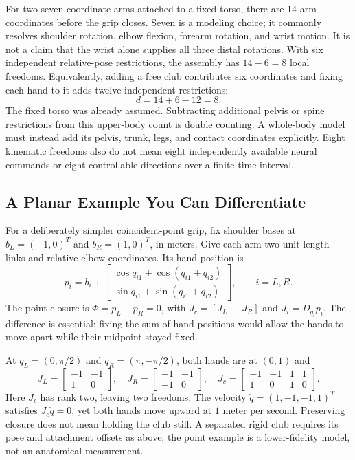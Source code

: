 For two seven-coordinate arms attached to a fixed torso, there are 14 arm
coordinates before the grip closes. Seven is a modeling choice; it commonly
resolves shoulder rotation, elbow flexion, forearm rotation, and wrist motion.
It is not a claim that the wrist alone supplies all three distal rotations.
With six independent relative-pose restrictions, the assembly has $14-6=8$
local freedoms. Equivalently, adding a free club contributes six coordinates
and fixing each hand to it adds twelve independent restrictions:
\begin{equation}
 d=14+6-12=8.
 \label{eq:two_arm_dof_with_grip}
\end{equation}
The fixed torso was already assumed. Subtracting additional pelvis or spine
restrictions from this upper-body count is double counting. A whole-body model
must instead add its pelvis, trunk, legs, and contact coordinates explicitly.
Eight kinematic freedoms also do not mean eight independently available neural
commands or eight controllable directions over a finite time interval.

\subsection{A Planar Example You Can Differentiate}

For a deliberately simpler coincident-point grip, fix shoulder bases at
$b_L=(-1,0)^T$ and $b_R=(1,0)^T$, in meters. Give each arm two unit-length links
and relative elbow coordinates. Its hand position is
\begin{equation}
 p_i=b_i+
 \begin{bmatrix}\cos q_{i1}+\cos(q_{i1}+q_{i2})\\
 \sin q_{i1}+\sin(q_{i1}+q_{i2})\end{bmatrix},\qquad i=L,R.
 \label{eq:two_arm_positions}
\end{equation}
The point closure is $\Phi=p_L-p_R=0$, with $J_c=[J_L\;-J_R]$ and
$J_i=D_{q_i}p_i$. The difference is essential: fixing the sum of hand positions
would allow the hands to move apart while their midpoint stayed fixed.

At $q_L=(0,\pi/2)$ and $q_R=(\pi,-\pi/2)$, both hands are at $(0,1)$ and
\begin{equation}
 J_L=\begin{bmatrix}-1&-1\\1&0\end{bmatrix},\quad
 J_R=\begin{bmatrix}-1&-1\\-1&0\end{bmatrix},\quad
 J_c=\begin{bmatrix}-1&-1&1&1\\1&0&1&0\end{bmatrix}.
 \label{eq:two_arm_loop_jacobian}
\end{equation}
Here $J_c$ has rank two, leaving two freedoms. The velocity
$\dot q=(1,-1,-1,1)^T$ satisfies $J_c\dot q=0$, yet both hands move upward at
$1$ meter per second. Preserving closure does not mean holding the club still.
A separated rigid club requires its pose and attachment offsets as above; the
point example is a lower-fidelity model, not an anatomical measurement.

